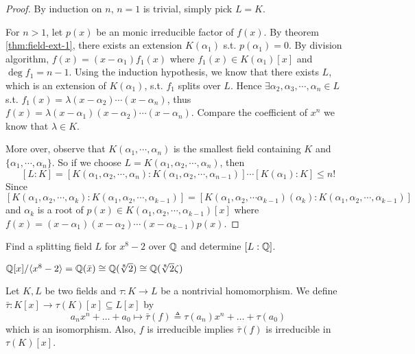 \begin{proof}
  By induction on $n$, $n = 1$ is trivial, simply pick $L = K$.

  For $n > 1$, let $p(x)$ be an monic irreducible factor of $f(x)$.
  By theorem \ref{thm:field-ext-1}, there exists an extension $K(\alpha_1)$ s.t. $p(\alpha_1) = 0$.
  By division algorithm, $f(x) = (x - \alpha_1) f_1(x)$ where $f_1(x) \in K(\alpha_1)[x]$
  and $\deg f_1 = n - 1$. Using the induction hypothesis, we know that there exists $L$,
  which is an extension of $K(\alpha_1)$, s.t. $f_1$
  splits over $L$. Hence $\exists \alpha_2, \alpha_3, \cdots, \alpha_n \in L$ s.t.
  $ f_1(x) = \lambda (x - \alpha_2) \cdots (x - \alpha_n)$,
  thus $f(x) = \lambda (x - \alpha_1) (x - \alpha_2) \cdots (x - \alpha_n)$. Compare the
  coefficient of $x^n$ we know that $\lambda \in K$.

  More over, observe that $K(\alpha_1, \cdots, \alpha_n)$ is the smallest field containing $K$ and
  $\{ \alpha_1, \cdots, \alpha_n\}$. So if we choose $L = K(\alpha_1, \alpha_2, \cdots, \alpha_n)$,
  then
  \[ [L: K] = [K(\alpha_1, \alpha_2, \cdots, \alpha_n): K(\alpha_1, \alpha_2, \cdots, \alpha_{n-1})]
    \cdots
    [K(\alpha_1): K] \leq n! \]
  Since $[K(\alpha_1, \alpha_2, \cdots, \alpha_k): K(\alpha_1, \alpha_2, \cdots, \alpha_{k-1})]
  = [K(\alpha_1, \alpha_2, \cdots \alpha_{k-1})(\alpha_k): K(\alpha_1, \alpha_2, \cdots, \alpha_{k-1})]$
  and $\alpha_k$ is a root of $p(x) \in K(\alpha_1, \alpha_2, \cdots, \alpha_{k-1})[x]$
  where $f(x) = (x - \alpha_1)(x - \alpha_2) \cdots (x - \alpha_{k-1}) p(x)$.
\end{proof}

\begin{example}
  Find a splitting field $L$ for $x^8 - 2$ over $\mathbb{Q}$ and determine $[L : \mathbb{Q}]$.
\end{example}

\begin{remark}
  ${\mathbb{Q}[x]}/{\langle x^8 - 2\rangle} = \mathbb{Q}(\bar{x}) \cong \mathbb{Q}(\sqrt[8]{2})
  \cong \mathbb{Q}(\sqrt[8]{2} \zeta)$
\end{remark}

\begin{prop} \label{prop:after-homo-still-irr}
  Let $K, L$ be two fields and $\tau: K \to L$ be a nontrivial homomorphism.
  We define $\bar\tau : K[x] \to \tau(K)[x] \subseteq L[x]$ by
  \[ a_n x^n + \ldots + a_0 \mapsto \bar\tau(f) \triangleq \tau(a_n)x^n + \ldots + \tau(a_0) \]
  which is an isomorphism. Also, $f$ is irreducible implies $\bar\tau(f)$ is irreducible in $\tau(K)[x]$.
\end{prop}

